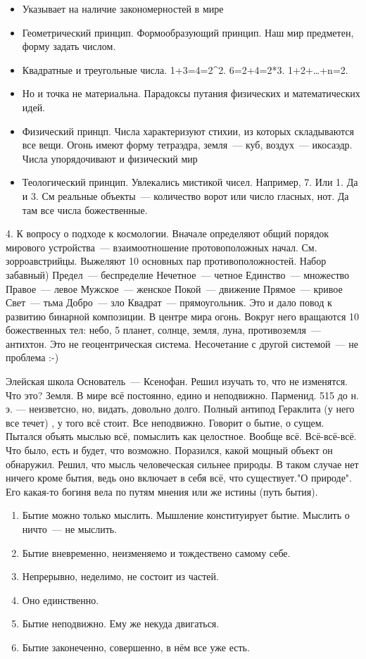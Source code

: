 \begin{itemize}
	\item Указывает на наличие закономерностей в мире
	\item Геометрический принцип. Формообразующий принцип. Наш мир предметен, форму задать числом. 
	\item Квадратные и треугольные числа. 1+3=4=2^2. 6=2+4=2*3. 1+2+\ldots+n=2. 
	\item Но и точка не материальна. Парадоксы путания физических и математических идей. 
	\item Физический принцп. Числа характеризуют стихии, из которых складываются все вещи. Огонь имеют форму тетраэдра, земля~--- куб, воздух~--- икосаэдр. Числа упорядочивают и физический мир
	\item Теологический принцип. Увлекались мистикой чисел. Например, 7. Или 1. Да и 3. См реальные объекты~--- количество ворот или число гласных, нот. Да там все числа божественные. 
\end{itemize}

4. К вопросу о подходе к космологии. Вначале определяют общий порядок мирового устройства~--- взаимоотношение протовоположных начал. См. зорроавстрийцы. Выжеляют 10 основных пар противоположностей. Набор забавный) 
Предел~--- беспределие
Нечетное~--- четное
Единство~--- множество
Правое~--- левое
Мужское~--- женское
Покой~--- движение
Прямое~--- кривое
Свет~--- тьма
Добро~--- зло
Квадрат~--- прямоугольник. 
Это и дало повод к развитию бинарной композиции. 
В центре мира огонь. Вокруг него вращаются 10 божественных тел: небо, 5 планет, солнце, земля, луна, противоземля~--- антихтон. Это не геоцентрическая система. Несочетание с другой системой~--- не проблема :-) 

Элейская школа
Основатель~--- Ксенофан. Решил изучать то, что не изменятся. Что это? Земля. В мире всё постоянно, едино и неподвижно. 
Парменид. 515 до н. э. --- неизветсно, но, видать, довольно долго. Полный антипод Гераклита (у него все течет) , у того всё стоит. Все неподвижно. Говорит о бытие, о сущем. 
Пытался объять мыслью всё, помыслить как целостное. Вообще всё. Всё-всё-всё. Что было, есть и будет, что возможно. Поразился, какой мощный объект он обнаружил. Решил, что мысль человеческая сильнее природы. 
В таком случае нет ничего кроме бытия, ведь оно включает в себя всё, что существует."О природе". Его какая-то богиня вела по путям мнения или же истины (путь бытия). 
\begin{enumerate}
	\item Бытие можно только мыслить. Мышление конституирует бытие. Мыслить о ничто~--- не мыслить. 
	\item Бытие вневременно, неизменяемо и тождествено самому себе. 
	\item Непрерывно, неделимо, не состоит из частей. 
	\item Оно единственно. 
	\item Бытие неподвижно. Ему же некуда двигаться. 
	\item Бытие законеченно, совершенно, в нём все уже есть. 
\end{enumerate}

